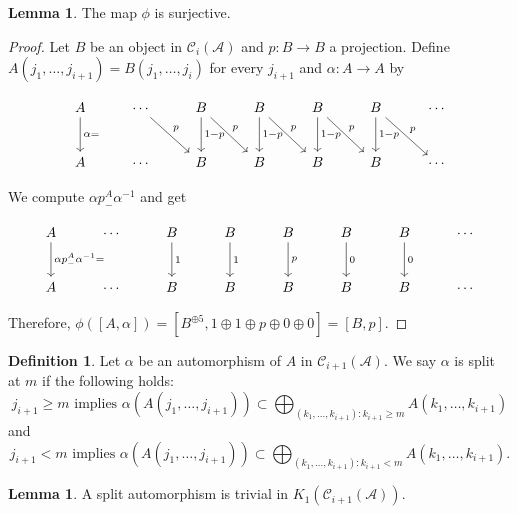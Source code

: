 \documentclass{article}
\theoremstyle{definition}
\newtheorem{defn}[theorem]{Definition}
\newtheorem{lem}[theorem]{Lemma}
\newcommand{\CA}{{ \mathcal A}}
\def \al {\alpha}
\begin{document}
\begin{lem}
    The map $\phi$ is surjective.
\end{lem}
\begin{proof}
    Let $B$ be an object in $\mathcal{C}_i(\CA)$ and $p: B\rightarrow B$ a projection. Define $A(j_1, \dots, j_{i+1})= B(j_1, \dots, j_i)$ for every $j_{i+1}$ and $\alpha: A\rightarrow A$ by 




\[ 
\begin{tikzcd}[column sep=2.5em, row sep=2.5em]
A \arrow[d, "\al="] & \cdots \arrow[dr, "p"] & B \arrow[d, "1-p"] \arrow[dr, "p"] & B \arrow[d, "1-p"] \arrow[dr, "p"] & B \arrow[d, "1-p"] \arrow[dr, "p"] & B \arrow[d, "1-p"] \arrow[dr, "p"] &\cdots   \\
A          &  \cdots                 & B  & B  & B & B  &\cdots
\end{tikzcd}
\]

We compute $\al p^A_- \al^{-1}$ and get

\[ 
\begin{tikzcd}[column sep=2.5em, row sep=2.5em]
A \arrow[d, "\al p^A_- \al^{-1}="] & \cdots  & B \arrow[d, "1"] & B \arrow[d, "1"]  & B \arrow[d, "p"]  & B \arrow[d, "0"] & B \arrow[d, "0"] &\cdots   \\
A          &  \cdots                 & B  & B  & B & B &B  &\cdots
\end{tikzcd}
\]

Therefore, $\phi([A, \al])=[B^{\oplus 5}, 1\oplus 1 \oplus p \oplus 0 \oplus 0]=[B, p].$

\end{proof}
\begin{defn}
    Let $\alpha$ be an automorphism of $A$ in $\mathcal C_{i+1}(\CA)$. We say $\alpha$ is split at $m$ if the following holds:
    $$j_{i+1}\geq m \text{ implies } \alpha(A(j_1, \dots, j_{i+1}))\subset \bigoplus_{(k_1, \dots, k_{i+1}): k_{i+1}\geq m}A(k_1, \dots, k_{i+1})$$
    and 
    $$j_{i+1}< m \text{ implies } \alpha(A(j_1, \dots, j_{i+1}))\subset \bigoplus_{(k_1, \dots, k_{i+1}): k_{i+1}< m}A(k_1, \dots, k_{i+1}).$$
\end{defn}
\begin{lem}
    A split automorphism is trivial in $K_1(\mathcal C_{i+1}(\CA))$.
\end{lem}
\end{document}
